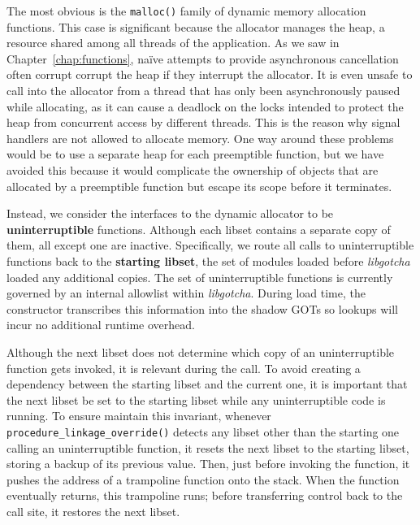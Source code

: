 The most obvious is the \texttt{malloc()} family of dynamic memory allocation
functions.  This case is significant because the allocator manages the heap, a
resource shared among all threads of the application.  As we saw in
Chapter~\ref{chap:functions}, na\"ive attempts to provide asynchronous cancellation
often corrupt corrupt the heap if they interrupt the allocator.  It is even unsafe to
call into the allocator from a thread that has only been asynchronously paused while
allocating, as it can cause a deadlock on the locks intended to protect the heap from
concurrent access by different threads.  This is the reason why signal handlers are
not allowed to allocate memory.  One way around these problems would be to use a
separate heap for each preemptible function, but we have avoided this because it
would complicate the ownership of objects that are allocated by a preemptible
function but escape its scope before it terminates.

Instead, we consider the interfaces to the dynamic allocator to be
\textbf{uninterruptible} functions.  Although each libset contains a separate copy of
them, all except one are inactive.  Specifically, we route all calls to
uninterruptible functions back to the \textbf{starting libset}, the set of modules
loaded before \textit{libgotcha} loaded any additional copies.  The set of
uninterruptible functions is currently governed by an internal allowlist within
\textit{libgotcha}.  During load time, the constructor transcribes this information
into the shadow GOTs so lookups will incur no additional runtime overhead.

\begin{sloppypar}
Although the next libset does not determine which copy of an uninterruptible function
gets invoked, it is relevant during the call.  To avoid creating a dependency between
the starting libset and the current one, it is important that the next libset be set
to the starting libset while any uninterruptible code is running.  To ensure maintain
this invariant, whenever \texttt{procedure\_linkage\_override()} detects any libset
other than the starting one calling an uninterruptible function, it resets the next
libset to the starting libset, storing a backup of its previous value.  Then, just
before invoking the function, it pushes the address of a trampoline function onto the
stack.  When the function eventually returns, this trampoline runs; before
transferring control back to the call site, it restores the next libset.
\end{sloppypar}

